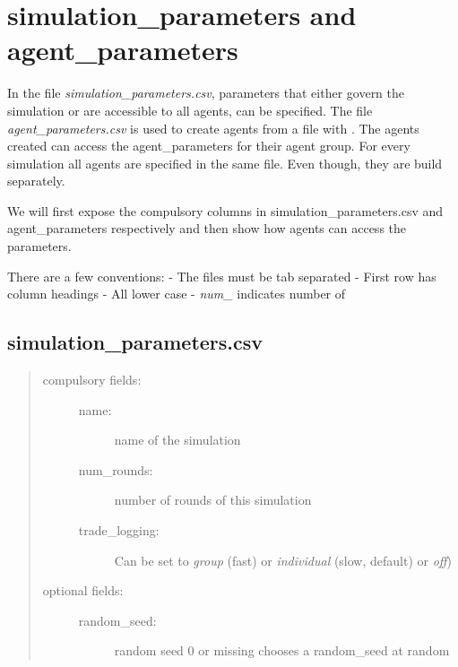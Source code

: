 \documentclass[letterpaper,10pt,english]{sphinxmanual}
\begin{document}
\chapter{simulation\_parameters and agent\_parameters}
\label{parameters::doc}\label{parameters:simulation-parameters-and-agent-parameters}
In the file \emph{simulation\_parameters.csv}, parameters
that either govern the simulation or are accessible to all agents, can be specified.
The file \emph{agent\_parameters.csv} is used to create agents from a file with
{\hyperref[simulation:abce.Simulation.build_agents_from_file]{}}. The agents created can access
the agent\_parameters for their agent group. For every simulation all agents are
specified in the same file. Even though, they are build separately.

We will first expose the compulsory columns in simulation\_parameters.csv
and agent\_parameters respectively and then show how agents can access
the parameters.

There are a few conventions:
- The files must be tab separated
- First row has column headings
- All lower case
- \emph{num\_} indicates number of


\section{simulation\_parameters.csv}
\label{parameters:simulation-parameters-csv}\begin{quote}
\begin{description}
\item[{compulsory fields:}] \leavevmode\begin{description}
\item[{name:}] \leavevmode
name of the simulation

\item[{num\_rounds:}] \leavevmode
number of rounds of this simulation

\item[{trade\_logging:}] \leavevmode
Can be set to \emph{group} (fast) or \emph{individual} (slow, default) or \emph{off})

\end{description}

\item[{optional fields:}] \leavevmode\begin{description}
\item[{random\_seed:}] \leavevmode
random seed 0 or missing chooses a random\_seed at random

\end{description}

\end{description}
\end{quote}
\end{document}
